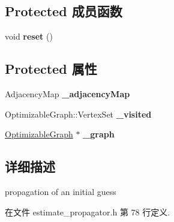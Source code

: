 \subsection*{Protected 成员函数}
\begin{DoxyCompactItemize}
\item 
\hypertarget{classg2o_1_1EstimatePropagator_a8319099eda0552b9ef62a0bb40bb0785}{void {\bfseries reset} ()}\label{classg2o_1_1EstimatePropagator_a8319099eda0552b9ef62a0bb40bb0785}

\end{DoxyCompactItemize}
\subsection*{Protected 属性}
\begin{DoxyCompactItemize}
\item 
\hypertarget{classg2o_1_1EstimatePropagator_ac3f6429938db62696444fd7ee765439a}{Adjacency\-Map {\bfseries \-\_\-adjacency\-Map}}\label{classg2o_1_1EstimatePropagator_ac3f6429938db62696444fd7ee765439a}

\item 
\hypertarget{classg2o_1_1EstimatePropagator_a1256927d6d1832ee300daa53d1c845a2}{Optimizable\-Graph\-::\-Vertex\-Set {\bfseries \-\_\-visited}}\label{classg2o_1_1EstimatePropagator_a1256927d6d1832ee300daa53d1c845a2}

\item 
\hypertarget{classg2o_1_1EstimatePropagator_ac2dcd3169696692ce3f0679235933e8a}{\hyperlink{structg2o_1_1OptimizableGraph}{Optimizable\-Graph} $\ast$ {\bfseries \-\_\-graph}}\label{classg2o_1_1EstimatePropagator_ac2dcd3169696692ce3f0679235933e8a}

\end{DoxyCompactItemize}


\subsection{详细描述}
propagation of an initial guess 

在文件 estimate\-\_\-propagator.\-h 第 78 行定义.



